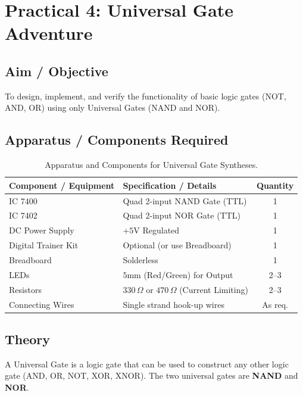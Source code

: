 \chapter{Practical 4: Universal Gate Adventure}

\section{Aim / Objective}
To design, implement, and verify the functionality of basic logic gates (NOT, AND, OR) using only Universal Gates (NAND and NOR).

\section{Apparatus / Components Required}

\begin{table}[htbp]
\centering
\small
\begin{tabularx}{\textwidth}{l X c}
\toprule
\textbf{Component / Equipment} & \textbf{Specification / Details} & \textbf{Quantity} \\
\midrule
IC 7400 & Quad 2-input NAND Gate (TTL) & 1 \\
IC 7402 & Quad 2-input NOR Gate (TTL) & 1 \\
DC Power Supply & $+5\text{V}$ Regulated & 1 \\
Digital Trainer Kit & Optional (or use Breadboard) & 1 \\
Breadboard & Solderless & 1 \\
LEDs & $5\text{mm}$ (Red/Green) for Output & 2--3 \\
Resistors & $330\,\Omega$ or $470\,\Omega$ (Current Limiting) & 2--3 \\
Connecting Wires & Single strand hook-up wires & As req. \\
\bottomrule
\end{tabularx}
\caption{Apparatus and Components for Universal Gate Syntheses.}
\label{tab:universal-apparatus}
\end{table}

\section{Theory}

\begin{definition}
A Universal Gate is a logic gate that can be used to construct any other logic gate (AND, OR, NOT, XOR, XNOR). The two universal gates are \textbf{NAND} and \textbf{NOR}.
\end{definition}

